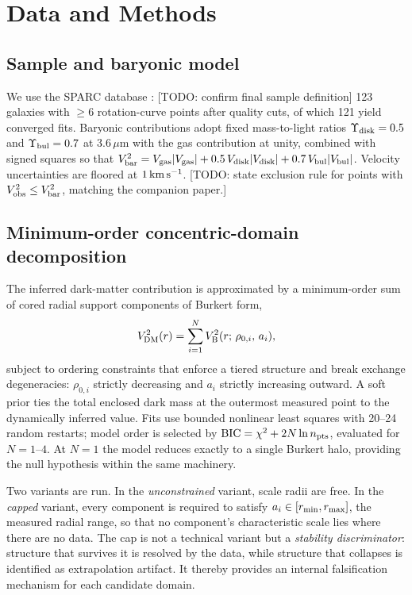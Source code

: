 \documentclass[twocolumn]{aastex631}
\begin{document}
\section{Data and Methods} \label{sec:methods}

\subsection{Sample and baryonic model}

We use the SPARC database \citep{Lelli2016}: [TODO: confirm final sample
definition] 123 galaxies with $\geq 6$ rotation-curve points after quality
cuts, of which 121 yield converged fits. Baryonic contributions adopt fixed
mass-to-light ratios $\Upsilon_{\rm disk} = 0.5$ and $\Upsilon_{\rm bul} =
0.7$ at $3.6\,\mu$m with the gas contribution at unity, combined with signed
squares so that $V^2_{\rm bar} = V_{\rm gas}|V_{\rm gas}| + 0.5\,V_{\rm
disk}|V_{\rm disk}| + 0.7\,V_{\rm bul}|V_{\rm bul}|$. Velocity uncertainties
are floored at $1\,{\rm km\,s^{-1}}$. [TODO: state exclusion rule for points
with $V^2_{\rm obs} \le V^2_{\rm bar}$, matching the companion paper.]

\subsection{Minimum-order concentric-domain decomposition}
\label{sec:tiers}

The inferred dark-matter contribution is approximated by a minimum-order sum
of cored radial support components of Burkert form,
\begin{equation}
V^2_{\rm DM}(r) = \sum_{i=1}^{N} V^2_{\rm B}(r;\,\rho_{0,i},\,a_i),
\end{equation}
subject to ordering constraints that enforce a tiered structure and break
exchange degeneracies: $\rho_{0,i}$ strictly decreasing and $a_i$ strictly
increasing outward. A soft prior ties the total enclosed dark mass at the
outermost measured point to the dynamically inferred value. Fits use bounded
nonlinear least squares with 20--24 random restarts; model order is selected
by ${\rm BIC} = \chi^2 + 2N \ln n_{\rm pts}$, evaluated for $N = 1$--$4$.
At $N = 1$ the model reduces exactly to a single Burkert halo, providing the
null hypothesis within the same machinery.

Two variants are run. In the \emph{unconstrained} variant, scale radii are
free. In the \emph{capped} variant, every component is required to satisfy
$a_i \in [r_{\rm min}, r_{\rm max}]$, the measured radial range, so that no
component's characteristic scale lies where there are no data. The cap is not
a technical variant but a \emph{stability discriminator}: structure that
survives it is resolved by the data, while structure that collapses is
identified as extrapolation artifact. It thereby provides an internal
falsification mechanism for each candidate domain.
\end{document}
